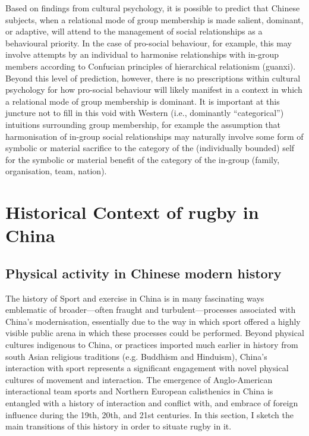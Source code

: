 \begin{CJK}{UTF8}{gbsn}
Based on findings from cultural psychology, it is possible to predict that Chinese subjects, when a relational mode of group membership is made salient, dominant, or adaptive, will attend to the management of social relationships as a behavioural priority.  In the case of pro-social behaviour, for example, this may involve attempts by an individual to harmonise relationships with in-group members according to Confucian principles of hierarchical relationism (guanxi).  Beyond this level of prediction, however, there is no prescriptions within cultural psychology for how pro-social behaviour will likely manifest in a context in which a relational mode of group membership is dominant.  It is important at this juncture not to fill in this void with Western (i.e., dominantly ``categorical'') intuitions surrounding group membership, for example the assumption that harmonisation of in-group social relationships may naturally involve some form of symbolic or material sacrifice to the category of the (individually bounded) self for the symbolic or material benefit of the category of the in-group (family, organisation, team, nation).












\section{Historical Context of rugby in China}

\subsection{Physical activity in Chinese modern history}
The history of Sport and exercise in China is in many fascinating ways emblematic of broader---often fraught and turbulent---processes associated with China's modernisation, essentially due to the way in which sport offered a highly visible public arena in which these processes could be performed.  Beyond physical cultures indigenous to China, or practices imported much earlier in history from south Asian religious traditions (e.g. Buddhism and Hinduism), China's interaction with sport represents a significant engagement with novel physical cultures of movement and interaction.  The emergence of Anglo-American interactional team sports and Northern European calisthenics in China is entangled with a history of interaction and conflict with, and embrace of foreign influence during the 19th, 20th, and 21st centuries.  In this section, I sketch the main transitions of this history in order to situate rugby in it.


\end{CJK}
